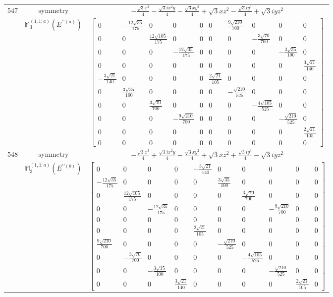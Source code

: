 \documentclass[fleqn,8pt,landscape]{jsarticle}
\begin{document}
\begin{longtable}{ccc}
$ 547 $ & $ \text{symmetry} $ & $ - \frac{\sqrt{3} x^{3}}{4} - \frac{\sqrt{3} i x^{2} y}{4} - \frac{\sqrt{3} x y^{2}}{4} + \sqrt{3} x z^{2} - \frac{\sqrt{3} i y^{3}}{4} + \sqrt{3} i y z^{2} $ \\
$  $ & $ \mathbb{M}_{3}^{(1,1;a)}(E^{\prime\prime(a)}) $ & $ \begin{bmatrix} 0 & - \frac{12 \sqrt{35}}{175} & 0 & 0 & 0 & 0 & \frac{9 \sqrt{210}}{700} & 0 & 0 & 0 \\ 0 & 0 & \frac{12 \sqrt{105}}{175} & 0 & 0 & 0 & 0 & - \frac{3 \sqrt{70}}{700} & 0 & 0 \\ 0 & 0 & 0 & - \frac{12 \sqrt{35}}{175} & 0 & 0 & 0 & 0 & - \frac{3 \sqrt{35}}{100} & 0 \\ 0 & 0 & 0 & 0 & 0 & 0 & 0 & 0 & 0 & \frac{3 \sqrt{21}}{140} \\ - \frac{3 \sqrt{21}}{140} & 0 & 0 & 0 & 0 & \frac{2 \sqrt{21}}{105} & 0 & 0 & 0 & 0 \\ 0 & \frac{3 \sqrt{35}}{100} & 0 & 0 & 0 & 0 & - \frac{\sqrt{210}}{525} & 0 & 0 & 0 \\ 0 & 0 & \frac{3 \sqrt{70}}{700} & 0 & 0 & 0 & 0 & - \frac{4 \sqrt{105}}{525} & 0 & 0 \\ 0 & 0 & 0 & - \frac{9 \sqrt{210}}{700} & 0 & 0 & 0 & 0 & - \frac{\sqrt{210}}{525} & 0 \\ 0 & 0 & 0 & 0 & 0 & 0 & 0 & 0 & 0 & \frac{2 \sqrt{21}}{105} \\ 0 & 0 & 0 & 0 & 0 & 0 & 0 & 0 & 0 & 0 \end{bmatrix} $ \\ \hline
$ 548 $ & $ \text{symmetry} $ & $ - \frac{\sqrt{3} x^{3}}{4} + \frac{\sqrt{3} i x^{2} y}{4} - \frac{\sqrt{3} x y^{2}}{4} + \sqrt{3} x z^{2} + \frac{\sqrt{3} i y^{3}}{4} - \sqrt{3} i y z^{2} $ \\
$  $ & $ \mathbb{M}_{3}^{(1,1;a)}(E^{\prime\prime(b)}) $ & $ \begin{bmatrix} 0 & 0 & 0 & 0 & - \frac{3 \sqrt{21}}{140} & 0 & 0 & 0 & 0 & 0 \\ - \frac{12 \sqrt{35}}{175} & 0 & 0 & 0 & 0 & \frac{3 \sqrt{35}}{100} & 0 & 0 & 0 & 0 \\ 0 & \frac{12 \sqrt{105}}{175} & 0 & 0 & 0 & 0 & \frac{3 \sqrt{70}}{700} & 0 & 0 & 0 \\ 0 & 0 & - \frac{12 \sqrt{35}}{175} & 0 & 0 & 0 & 0 & - \frac{9 \sqrt{210}}{700} & 0 & 0 \\ 0 & 0 & 0 & 0 & 0 & 0 & 0 & 0 & 0 & 0 \\ 0 & 0 & 0 & 0 & \frac{2 \sqrt{21}}{105} & 0 & 0 & 0 & 0 & 0 \\ \frac{9 \sqrt{210}}{700} & 0 & 0 & 0 & 0 & - \frac{\sqrt{210}}{525} & 0 & 0 & 0 & 0 \\ 0 & - \frac{3 \sqrt{70}}{700} & 0 & 0 & 0 & 0 & - \frac{4 \sqrt{105}}{525} & 0 & 0 & 0 \\ 0 & 0 & - \frac{3 \sqrt{35}}{100} & 0 & 0 & 0 & 0 & - \frac{\sqrt{210}}{525} & 0 & 0 \\ 0 & 0 & 0 & \frac{3 \sqrt{21}}{140} & 0 & 0 & 0 & 0 & \frac{2 \sqrt{21}}{105} & 0 \end{bmatrix} $ \\ \hline
\end{longtable}
\end{document}
